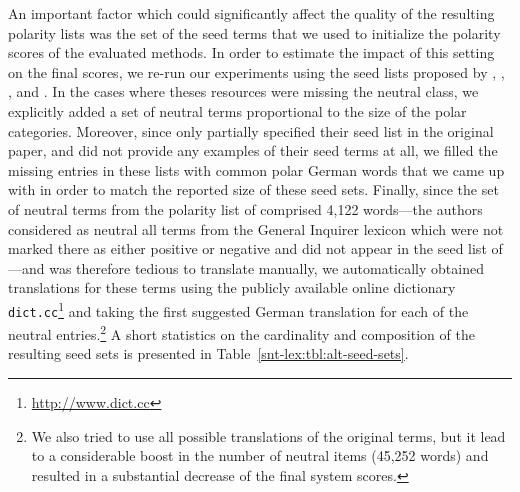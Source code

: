 An important factor which could significantly affect the quality of
the resulting polarity lists was the set of the seed terms that we
used to initialize the polarity scores of the evaluated methods.  In
order to estimate the impact of this setting on the final scores, we
re-run our experiments using the seed lists proposed by \citet{Hu:04},
\citet{Kim:04}, \citet{Esuli:06c}, and \citet{Remus:10}.  In the cases
where theses resources were missing the neutral class, we explicitly
added a set of neutral terms proportional to the size of the polar
categories.  Moreover, since \citet{Hu:04} only partially specified
their seed list in the original paper, and \citet{Kim:04} did not
provide any examples of their seed terms at all, we filled the missing
entries in these lists with common polar German words that we came up
with in order to match the reported size of these seed sets.  Finally,
since the set of neutral terms from the polarity list of
\citet{Esuli:06c} comprised 4,122 words---the authors considered as
neutral all terms from the General Inquirer lexicon \cite{Stone:66}
which were not marked there as either positive or negative and did not
appear in the seed list of \citet{Turney:03}---and was therefore
tedious to translate manually, we automatically obtained translations
for these terms using the publicly available online dictionary
\texttt{dict.cc}\footnote{\url{http://www.dict.cc}} and taking the
first suggested German translation for each of the neutral
entries.\footnote{We also tried to use all possible translations of
  the original terms, but it lead to a considerable boost in the
  number of neutral items (45,252 words) and resulted in a substantial
  decrease of the final system scores.} A short statistics on the
cardinality and composition of the resulting seed sets is presented in
Table~\ref{snt-lex:tbl:alt-seed-sets}.

